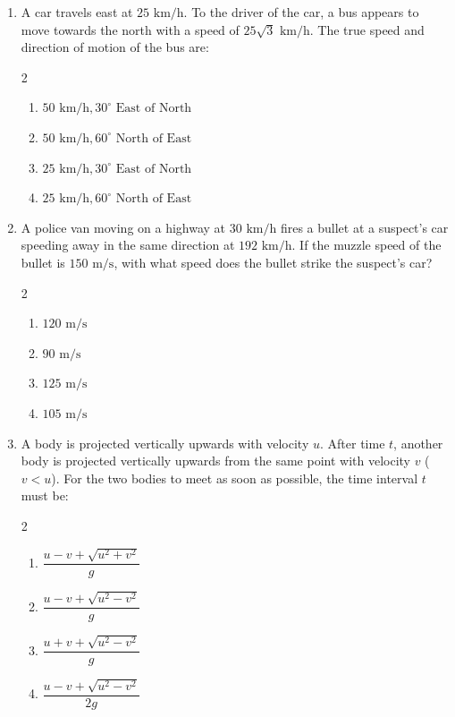 \documentclass[11pt,a4paper]{article}
\begin{document}
\begin{enumerate}[label=\textbf{\textcolor{l3Crimson}{Q\arabic*.}},leftmargin=24pt,itemsep=10pt,start=51]
  \item A car travels east at $25\text{ km/h}$. To the driver of the car, a bus appears to move towards the north with a speed of $25\sqrt{3}\text{ km/h}$. The true speed and direction of motion of the bus are:
  \begin{multicols}{2}
  \begin{enumerate}[label=\textbf{\textcolor{primaryDark}{(\Alph*)}},itemsep=2pt]
    \item $50\text{ km/h}, 30^\circ\text{ East of North}$
    \item $50\text{ km/h}, 60^\circ\text{ North of East}$
    \item $25\text{ km/h}, 30^\circ\text{ East of North}$
    \item $25\text{ km/h}, 60^\circ\text{ North of East}$
  \end{enumerate}
  \end{multicols}

  \item A police van moving on a highway at $30\text{ km/h}$ fires a bullet at a suspect's car speeding away in the same direction at $192\text{ km/h}$. If the muzzle speed of the bullet is $150\text{ m/s}$, with what speed does the bullet strike the suspect's car?
  \begin{multicols}{2}
  \begin{enumerate}[label=\textbf{\textcolor{primaryDark}{(\Alph*)}},itemsep=2pt]
    \item $120\text{ m/s}$
    \item $90\text{ m/s}$
    \item $125\text{ m/s}$
    \item $105\text{ m/s}$
  \end{enumerate}
  \end{multicols}

  \item A body is projected vertically upwards with velocity $u$. After time $t$, another body is projected vertically upwards from the same point with velocity $v$ ($v < u$). For the two bodies to meet as soon as possible, the time interval $t$ must be:
  \begin{multicols}{2}
  \begin{enumerate}[label=\textbf{\textcolor{primaryDark}{(\Alph*)}},itemsep=2pt]
    \item $\dfrac{u - v + \sqrt{u^2 + v^2}}{g}$
    \item $\dfrac{u - v + \sqrt{u^2 - v^2}}{g}$
    \item $\dfrac{u + v + \sqrt{u^2 - v^2}}{g}$
    \item $\dfrac{u - v + \sqrt{u^2 - v^2}}{2g}$
  \end{enumerate}
  \end{multicols}


\end{enumerate}
\end{document}
